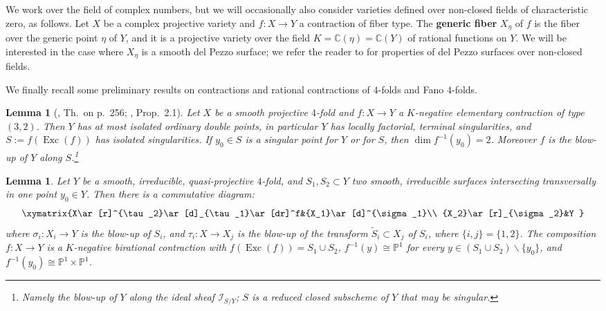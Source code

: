 \documentclass[a4paper,12pt]{amsart}
\newtheorem{lemma}[thm]{Lemma}
\theoremstyle{definition}
\numberwithin{figure}{section}
\numberwithin{table}{section}
\newcommand{\w}{\widetilde}
\newcommand{\ma}{\mathcal}
\newcommand{\pr}{\mathbb{P}}
\newcommand{\C}{\mathbb{C}}
\newcommand{\Exc}{\operatorname{Exc}}
\begin{document}
\bigskip

We work over the field of complex numbers, but we will occasionally also consider varieties defined over non-closed fields of characteristic zero, as follows. Let $X$ be a complex projective variety and $f\colon X\to Y$ a contraction of fiber type. The {\bf generic fiber} $X_\eta$ of $f$ is the fiber over the generic point $\eta$ of $Y$, and it is a projective variety over the field $K=\C(\eta)=\C(Y)$ of rational functions on $Y$. We will be interested in  the case where $X_{\eta}$ is a smooth del Pezzo surface;
we refer the reader to \cite{hassett} for properties of del Pezzo surfaces over non-closed fields.

\bigskip

We finally recall some preliminary results on contractions and rational contractions of $4$-folds and Fano $4$-folds.
\begin{lemma}[\cite{AW}, Th.~on p.~256; \cite{AW2}, Prop.~2.1]\label{singtarget}
  Let $X$ be a smooth projective $4$-fold and $f\colon X\to Y$ a $K$-negative elementary contraction of type $(3,2)$. Then $Y$ has at most isolated ordinary double points, in particular $Y$ has locally factorial, terminal singularities, and $S:= f(\Exc(f))$ has isolated singularities. If $y_0\in S$ is a singular point for $Y$ or for $S$, then $\dim f^{-1}(y_0)=2$.
  Moreover $f$ is the blow-up of $Y$ along $S$.\footnote{Namely the blow-up of $Y$ along the ideal sheaf $\ma{I}_{S/Y}$; $S$ is a reduced closed subscheme of $Y$ that may be singular.}
\end{lemma}
\begin{lemma}\label{blowuporder}
  Let $Y$ be a smooth, irreducible, quasi-projective $4$-fold, and $S_1,S_2\subset Y$ two smooth, irreducible surfaces intersecting transversally in one point $y_0\in Y$. Then there is a commutative diagram:
  $$\xymatrix{X\ar[r]^{\tau_2}\ar[d]_{\tau_1}\ar[dr]^f&{X_1}\ar[d]^{\sigma_1}\\
    {X_2}\ar[r]_{\sigma_2}&Y
  }$$
  where $\sigma_i\colon X_i\to Y$ is the blow-up of $S_i$, and $\tau_i\colon X\to X_j$ is the blow-up of the transform $\w{S}_i\subset X_j$ of $S_i$, where $\{i,j\}=\{1,2\}$. The composition $f\colon X\to Y$ is a $K$-negative birational contraction with $f(\Exc(f))=S_1\cup S_2$, $f^{-1}(y)\cong\pr^1$ for every $y\in (S_1\cup S_2)\smallsetminus\{ y_0\}$, and $f^{-1}(y_0)\cong\pr^1\times\pr^1$.
\end{lemma}
\end{document}
